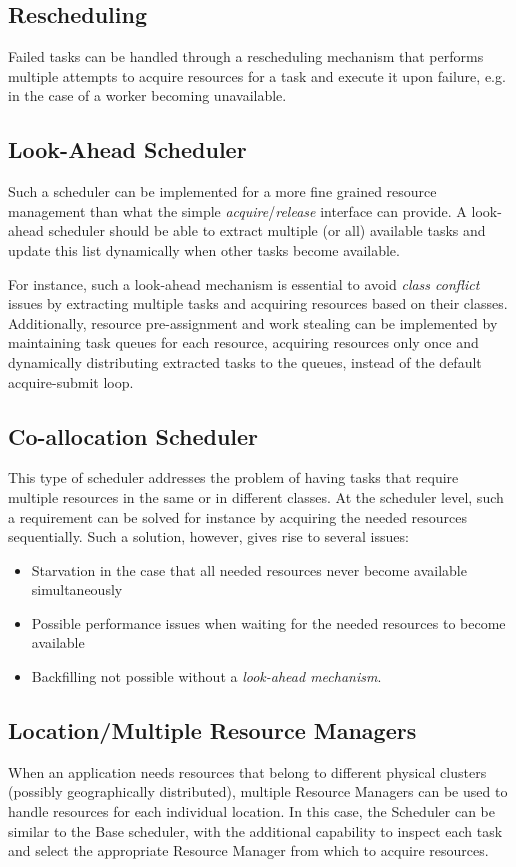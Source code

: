 \documentclass[10pt]{article}
\begin{document}
\subsection{Rescheduling}
Failed tasks can be handled through a rescheduling mechanism that performs
multiple attempts to acquire resources for a task and execute it upon failure,
e.g. in the case of a worker becoming unavailable. 

\subsection{Look-Ahead Scheduler}

Such a scheduler can be implemented for a more fine grained resource management
than what the simple \emph{acquire}/\emph{release} interface can provide. A
look-ahead scheduler should be able to extract multiple (or all) available tasks
and update this list dynamically when other tasks become available.

For instance, such a look-ahead mechanism is essential to avoid \emph{class
    conflict} issues by extracting multiple tasks and acquiring resources based on
their classes.
Additionally, resource pre-assignment and work stealing can be implemented by
maintaining task queues for each resource, acquiring resources only once and
dynamically distributing extracted tasks to the queues, instead of the default
acquire-submit loop.

\subsection{Co-allocation Scheduler}
This type of scheduler addresses the problem of having tasks that require
multiple resources in the same or in different classes. 
At the scheduler level, such a requirement can be solved for instance by
acquiring the needed resources sequentially.
Such a solution, however, gives rise to several issues:
\begin{itemize}
    \item Starvation in the case that all needed resources never become
    available simultaneously
    \item Possible performance issues when waiting for the needed resources to
    become available
    \item Backfilling not possible without a \emph{look-ahead mechanism}.
\end{itemize}

\subsection{Location/Multiple Resource Managers}
\label{sec:localtionsched}
When an application needs resources that belong to different physical clusters
(possibly geographically distributed), multiple Resource Managers can be used to
handle resources for each individual location.
In this case, the Scheduler can be similar to the Base scheduler, with the
additional capability to inspect each task and select the appropriate Resource
Manager from which to acquire resources. 
\end{document}
